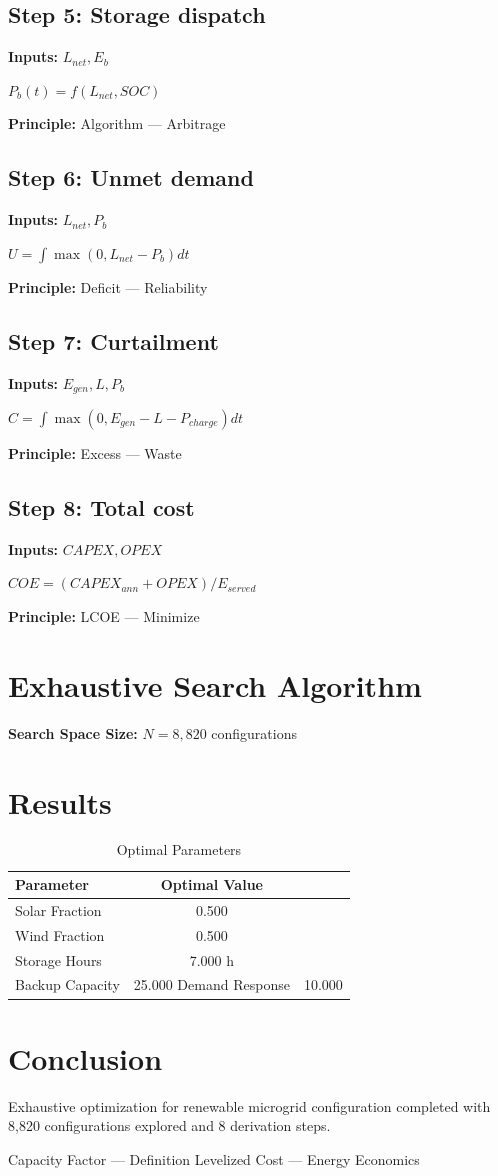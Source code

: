 \documentclass[11pt,twocolumn]{article}
\begin{document}
\subsection*{Step 5: Storage dispatch}
\textbf{Inputs:} $L_{net}, E_b$

$P_b(t) = f(L_{net}, SOC)$

\textbf{Principle:} Algorithm --- Arbitrage

\subsection*{Step 6: Unmet demand}
\textbf{Inputs:} $L_{net}, P_b$

$U = \int \max(0, L_{net} - P_b) dt$

\textbf{Principle:} Deficit --- Reliability

\subsection*{Step 7: Curtailment}
\textbf{Inputs:} $E_{gen}, L, P_b$

$C = \int \max(0, E_{gen} - L - P_{charge}) dt$

\textbf{Principle:} Excess --- Waste

\subsection*{Step 8: Total cost}
\textbf{Inputs:} $CAPEX, OPEX$

$COE = (CAPEX_{ann} + OPEX) / E_{served}$

\textbf{Principle:} LCOE --- Minimize


\section{Exhaustive Search Algorithm}

\textbf{Search Space Size:} $N = 8,820$ configurations

\section{Results}

\begin{table}[h]
\centering
\caption{Optimal Parameters}
\begin{tabular}{@{}lc@{}}
\toprule
Parameter & Optimal Value \\
\midrule
Solar Fraction & 0.500  \\
Wind Fraction & 0.500  \\
Storage Hours & 7.000 h \\
Backup Capacity & 25.000 %
Demand Response & 10.000 %
\bottomrule
\end{tabular}
\end{table}

\section{Conclusion}
Exhaustive optimization for renewable microgrid configuration completed with 8,820 configurations explored and 8 derivation steps.

\begin{thebibliography}{9}
 Capacity Factor --- Definition
 Levelized Cost --- Energy Economics
\end{thebibliography}
\end{document}

